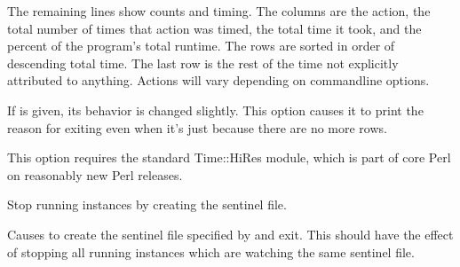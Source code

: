 \documentclass[letterpaper,10pt,english]{sphinxmanual}
\begin{document}
\begin{fulllineitems}
The remaining lines show counts and timing.  The columns are the action, the
total number of times that action was timed, the total time it took, and the
percent of the program’s total runtime.  The rows are sorted in order of
descending total time.  The last row is the rest of the time not explicitly
attributed to anything.  Actions will vary depending on command\sphinxhyphen{}line options.

If {\hyperref[\detokenize{mariadb-archiver:cmdoption-mariadb-archiver-why-quit}]{}} is given, its behavior is changed slightly.  This option
causes it to print the reason for exiting even when it’s just because there are
no more rows.

This option requires the standard Time::HiRes module, which is part of core Perl
on reasonably new Perl releases.

\end{fulllineitems}


\begin{fulllineitems}
\label{\detokenize{mariadb-archiver:cmdoption-mariadb-archiver-stop}}
Stop running instances by creating the sentinel file.

Causes  to create the sentinel file specified by {\hyperref[\detokenize{mariadb-archiver:cmdoption-mariadb-archiver-sentinel}]{}} and
exit.  This should have the effect of stopping all running instances which are
watching the same sentinel file.

\end{fulllineitems}

\end{document}

